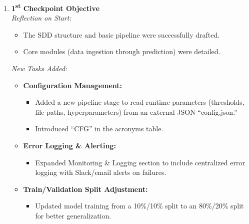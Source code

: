 \documentclass[12pt]{article}
\begin{document}
\begin{enumerate}[label=\textbf{\arabic*.}]
  \item \textbf{1\textsuperscript{st} Checkpoint Objective}\\
    \emph{Reflection on Start:}  
    \begin{itemize}
      \item The SDD structure and basic pipeline were successfully drafted.
      \item Core modules (data ingestion through prediction) were detailed.
    \end{itemize}
    \emph{New Tasks Added:}
    \begin{itemize}
      \item \textbf{Configuration Management:}  
        \begin{itemize}
          \item Added a new pipeline stage to read runtime parameters (thresholds, file paths, hyperparameters) from an external JSON “config.json.”
          \item Introduced “CFG” in the acronyms table.
        \end{itemize}
      \item \textbf{Error Logging \& Alerting:}  
        \begin{itemize}
          \item Expanded Monitoring \& Logging section to include centralized error logging with Slack/email alerts on failures.
        \end{itemize}
      \item \textbf{Train/Validation Split Adjustment:}  
        \begin{itemize}
          \item Updated model training from a 10\%/10\% split to an 80\%/20\% split for better generalization.
        \end{itemize}
    \end{itemize}


\end{enumerate}
\end{document}
